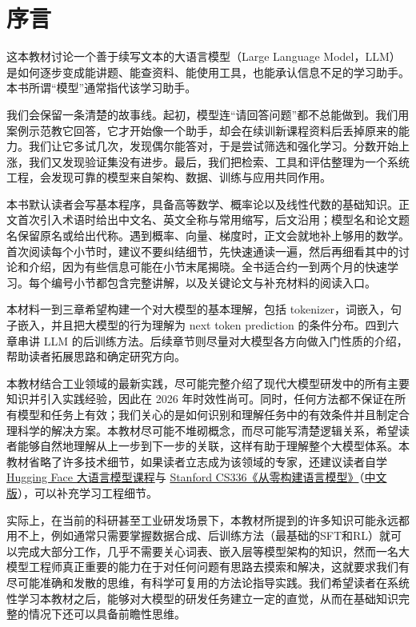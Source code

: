 \chapter{序言}\label{序言}

这本教材讨论一个善于续写文本的大语言模型（Large Language Model，LLM）是如何逐步变成能讲题、能查资料、能使用工具，也能承认信息不足的学习助手。本书所谓``模型''通常指代该学习助手。

我们会保留一条清楚的故事线。起初，模型连``请回答问题''都不总能做到。我们用案例示范教它回答，它才开始像一个助手，却会在续训新课程资料后丢掉原来的能力。我们让它多试几次，发现偶尔能答对，于是尝试筛选和强化学习。分数开始上涨，我们又发现验证集没有进步。最后，我们把检索、工具和评估整理为一个系统工程，会发现可靠的模型来自架构、数据、训练与应用共同作用。

本书默认读者会写基本程序，具备高等数学、概率论以及线性代数的基础知识。正文首次引入术语时给出中文名、英文全称与常用缩写，后文沿用；模型名和论文题名保留原名或给出代称。遇到概率、向量、梯度时，正文会就地补上够用的数学。首次阅读每个小节时，建议不要纠结细节，先快速通读一遍，然后再细看其中的讨论和介绍，因为有些信息可能在小节末尾揭晓。全书适合约一到两个月的快速学习。每个编号小节都包含完整讲解，以及关键论文与补充材料的阅读入口。

本材料一到三章希望构建一个对大模型的基本理解，包括 tokenizer，词嵌入，句子嵌入，并且把大模型的行为理解为 next token prediction 的条件分布。四到六章串讲 LLM 的后训练方法。后续章节则尽量对大模型各方向做入门性质的介绍，帮助读者拓展思路和确定研究方向。

本教材结合工业领域的最新实践，尽可能完整介绍了现代大模型研发中的所有主要知识并引入实践经验，因此在 2026 年时效性尚可。同时，任何方法都不保证在所有模型和任务上有效；我们关心的是如何识别和理解任务中的有效条件并且制定合理科学的解决方案。本教材尽可能不堆砌概念，而尽可能写清楚逻辑关系，希望读者能够自然地理解从上一步到下一步的关联，这样有助于理解整个大模型体系。本教材省略了许多技术细节，如果读者立志成为该领域的专家，还建议读者自学 \href{https://huggingface.co/learn/llm-course/chapter1/1}{Hugging Face 大语言模型课程}与 \href{https://cs336.stanford.edu/}{Stanford CS336《从零构建语言模型》}（\href{https://datawhalechina.github.io/diy-llm/}{中文版}），可以补充学习工程细节。

实际上，在当前的科研甚至工业研发场景下，本教材所提到的许多知识可能永远都用不上，例如通常只需要掌握数据合成、后训练方法（最基础的SFT和RL）就可以完成大部分工作，几乎不需要关心词表、嵌入层等模型架构的知识，然而一名大模型工程师真正重要的能力在于对任何问题有思路去摸索和解决，这就要求我们有尽可能准确和发散的思维，有科学可复用的方法论指导实践。我们希望读者在系统性学习本教材之后，能够对大模型的研发任务建立一定的直觉，从而在基础知识完整的情况下还可以具备前瞻性思维。